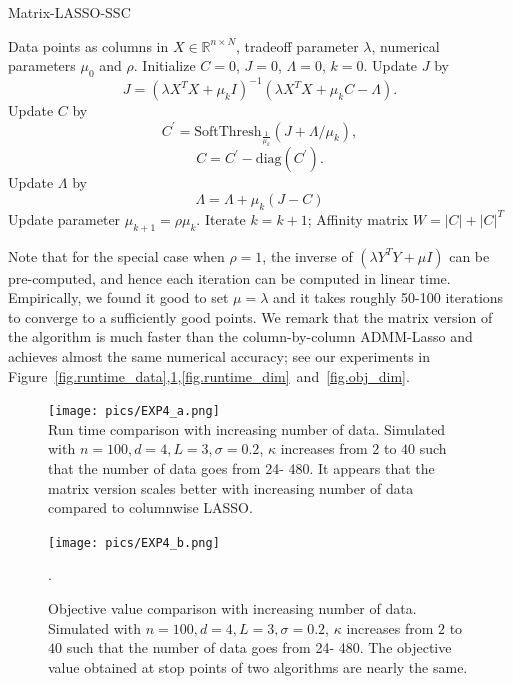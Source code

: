 \documentclass[twoside,11pt]{article}
\numberwithin{equation}{section}
\begin{document}
\begin{algorithm}[tb]
   \caption{Matrix-LASSO-SSC}
   \label{alg:MatrixSSC}
\begin{algorithmic}
   Data points as columns in $X\in \mathbb{R}^{n\times N}$, tradeoff parameter $\lambda$, numerical parameters $\mu_0$ and $\rho$.
   \STATE Initialize $C=0$, $J=0$, $\Lambda=0$, $k=0$.
    Update $J$ by
   $$J=(\lambda X^TX+\mu_k I)^{-1}(\lambda X^TX+\mu_k C-\Lambda).$$
    Update $C$ by
   $$ C^{'}=\mathrm{SoftThresh}_{\frac{1}{\mu_k}}\left(J+\Lambda/\mu_k\right), $$
   $$ C=C^{'}-\mathrm{diag}(C^{'}).$$
    Update $\Lambda$ by
   $$\Lambda=\Lambda+\mu_k(J-C)$$
    Update parameter $\mu_{k+1}=\rho\mu_k.$
    Iterate $k=k+1$;
   \ENDWHILE
    Affinity matrix $W=|C|+|C|^T$
\end{algorithmic}
\end{algorithm}

Note that for the special case when $\rho=1$, the inverse of $(\lambda Y^TY+\mu I)$ can be pre-computed, and hence each iteration can be computed in linear time. Empirically, we found it good to set $\mu=\lambda$ and it takes roughly 50-100 iterations to converge to a sufficiently good points. We remark that the matrix version of the algorithm is much faster than the column-by-column ADMM-Lasso and achieves almost the same numerical accuracy; see  our experiments in Figure~\ref{fig.runtime_data},\ref{fig.obj_data},\ref{fig.runtime_dim}~and~\ref{fig.obj_dim}.



\begin{figure}[htb]
\begin{minipage}[t]{0.48\linewidth}
  \centering
  \texttt{[image: pics/EXP4\_a.png]}\\
  \caption{Run time comparison with increasing number of data. Simulated with $n=100, d=4, L=3, \sigma=0.2$, $\kappa$ increases from $2$ to $40$ such that the number of data goes from 24- 480. It appears that the matrix version scales better with increasing number of data compared to columnwise LASSO.}\label{fig.runtime_data}
\end{minipage}
\hspace{0.02\linewidth}
\begin{minipage}[t]{0.48\linewidth}
  \centering
  \texttt{[image: pics/EXP4\_b.png]}\\
  \caption{Objective value comparison with increasing number of data. Simulated with $n=100, d=4, L=3, \sigma=0.2$, $\kappa$ increases from $2$ to $40$ such that the number of data goes from 24- 480. The objective value obtained at stop points of two algorithms are nearly the same.}.\label{fig.obj_data}
\end{minipage}
\end{figure}
\end{document}
